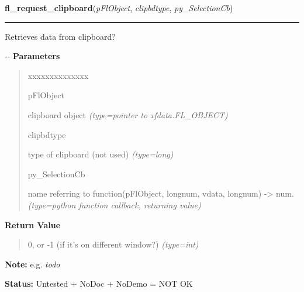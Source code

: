     \label{xformslib:flmisc:fl_request_clipboard}

    \vspace{0.5ex}

\hspace{.8\funcindent}\begin{boxedminipage}{\funcwidth}

    \raggedright \textbf{fl\_request\_clipboard}(\textit{pFlObject}, \textit{clipbdtype}, \textit{py\_SelectionCb})

    \vspace{-1.5ex}

    \rule{\textwidth}{0.5\fboxrule}
\setlength{\parskip}{2ex}

Retrieves data from clipboard?

-{}-
\setlength{\parskip}{1ex}
      \textbf{Parameters}
      \vspace{-1ex}

      \begin{quote}
        \begin{Ventry}{xxxxxxxxxxxxxx}

          \item[pFlObject]


clipboard object
            {\it (type=pointer to xfdata.FL\_OBJECT)}

          \item[clipbdtype]


type of clipboard (not used)
            {\it (type=long)}

          \item[py\_SelectionCb]


name referring to function(pFlObject, longnum, vdata, longnum)
-> num.
            {\it (type=python function callback, returning value)}

        \end{Ventry}

      \end{quote}

      \textbf{Return Value}
    \vspace{-1ex}

      \begin{quote}

0, or -1 (if it's on different window?)
      {\it (type=int)}

      \end{quote}

\textbf{Note:} 
e.g. \emph{todo}


\textbf{Status:} 
Untested + NoDoc + NoDemo = NOT OK


    \end{boxedminipage}


